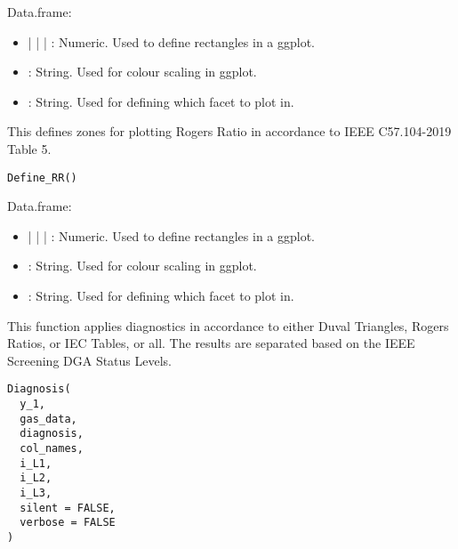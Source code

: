 \documentclass[a4paper]{book}
\begin{document}
%
\begin{Value}
Data.frame:
\begin{itemize}

\item{}  |  |  | : Numeric. Used to define rectangles in a ggplot.
\item{} : String. Used for colour scaling in ggplot.
\item{} : String. Used for defining which facet to plot in.

\end{itemize}

\end{Value}
%
\begin{Description}
This defines zones for plotting Rogers Ratio in accordance to IEEE C57.104-2019 Table 5.
\end{Description}
%
\begin{Usage}
\begin{verbatim}
Define_RR()
\end{verbatim}
\end{Usage}
%
\begin{Value}
Data.frame:
\begin{itemize}

\item{}  |  |  | : Numeric. Used to define rectangles in a ggplot.
\item{} : String. Used for colour scaling in ggplot.
\item{} : String. Used for defining which facet to plot in.

\end{itemize}

\end{Value}
%
\begin{Description}
This function applies diagnostics in accordance to either Duval Triangles, Rogers Ratios, or IEC Tables, or all. The results are separated based on the IEEE Screening DGA Status Levels.
\end{Description}
%
\begin{Usage}
\begin{verbatim}
Diagnosis(
  y_1,
  gas_data,
  diagnosis,
  col_names,
  i_L1,
  i_L2,
  i_L3,
  silent = FALSE,
  verbose = FALSE
)
\end{verbatim}
\end{Usage}
\end{document}
